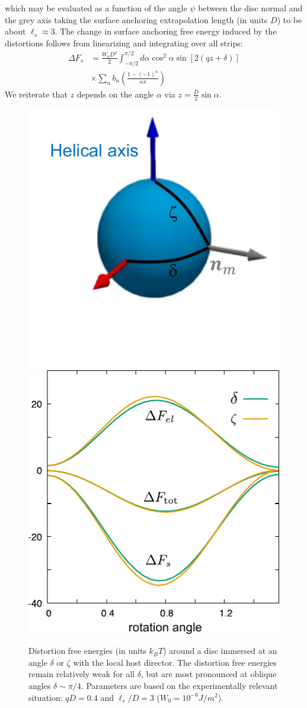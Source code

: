 \eeq
which may be evaluated as a function of the angle $\psi$ between the disc normal and the grey axis taking the surface anchoring extrapolation length (in units $D$) to be about $\ell_{s} \approx 3$.
The change in surface anchoring free energy induced by the distortions follows from linearizing  and integrating over all strips:
\begin{align}
\Delta F_{s}  &= \frac{W_{0}D^{2}}{2} \int_{-\pi/2}^{\pi/2} d \alpha \cos^{2} \alpha \sin[2(qz + \delta)] \nonumber \\
&\times \sum_{n} b_{n}  \left ( \frac{1-(-1)^{n}}{n \pi}\right )
\label{sadiscseries}
\end{align}
We reiterate that $z$ depends on the angle $\alpha$ via $z = \tfrac{D}{2} \sin \alpha$.
\begin{figure}
\includegraphics[width = 0.4 \columnwidth]{figures/chapter-3/deldisc}
	\includegraphics[width = 0.5 \columnwidth]{figures/chapter-3/discelastic}
	\caption{ Distortion free energies (in units $k_{B}T$) around a disc immersed at an angle $\delta$ or $\zeta$ with the local host director. The distortion free energies remain relatively weak for all $\delta$, but are most pronounced at oblique angles $\delta \sim \pi/4$. Parameters are based on the experimentally relevant situation: $qD =0.4$ and $\ell_{s}/D = 3$ ($W_{0} = 10^{-6} J/m^{2}$). }
	\label{discel}
\end{figure}






